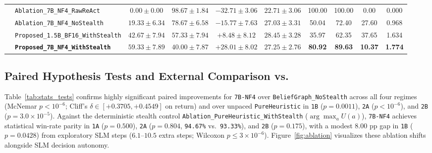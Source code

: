\documentclass[a4paper,fleqn]{cas-dc}
\begin{document}
\begin{table}[t]
{\begin{tabular}{llcccccccc}
  & \texttt{Ablation\_7B\_NF4\_RawReAct} & $0.00 \pm 0.00$ & $98.67 \pm 1.84$ & $-32.71 \pm 3.06$ & $22.71 \pm 3.06$ & 100.00 & 100.00 & 0.00 & 0.000 \\
  & \texttt{Ablation\_7B\_NF4\_NoStealth} & $19.33 \pm 6.34$ & $78.67 \pm 6.58$ & $-15.77 \pm 7.63$ & $27.03 \pm 3.31$ & 50.04 & 72.40 & 27.60 & 0.968 \\
  & \texttt{Proposed\_1.5B\_BF16\_WithStealth} & $42.67 \pm 7.94$ & $57.33 \pm 7.94$ & $+8.48 \pm 8.12$ & $28.45 \pm 3.28$ & 35.97 & 62.35 & 37.65 & 1.634 \\
  & \textbf{\texttt{Proposed\_7B\_NF4\_WithStealth}} & $59.33 \pm 7.89$ & $40.00 \pm 7.87$ & $+28.01 \pm 8.02$ & $27.25 \pm 2.76$ & \textbf{80.92} & \textbf{89.63} & \textbf{10.37} & \textbf{1.774} \\
\bottomrule
\end{tabular}%
}
\end{table}

\subsection{Paired Hypothesis Tests and External Comparison vs.\ \citet{rigaki2026building}}
Table~\ref{tab:stats_tests} confirms highly significant paired improvements for \texttt{7B-NF4} over \texttt{BeliefGraph\_NoStealth} across all four regimes (McNemar $p < 10^{-6}$; Cliff's $\delta \in [+0.3705, +0.4549]$ on return) and over unpaced \texttt{PureHeuristic} in \texttt{1B} ($p = 0.0011$), \texttt{2A} ($p < 10^{-6}$), and \texttt{2B} ($p = 3.0 \times 10^{-5}$). Against the deterministic stealth control \texttt{Ablation\_PureHeuristic\_WithStealth} ($\arg\max_a U(a)$), \texttt{7B-NF4} achieves statistical win-rate parity in \texttt{1A} ($p = 0.500$), \texttt{2A} ($p = 0.804$, \texttt{94.67\%} vs.\ \texttt{93.33\%}), and \texttt{2B} ($p = 0.175$), with a modest $8.00\text{ pp}$ gap in \texttt{1B} ($p = 0.0428$) from exploratory SLM steps ($6.1$--$10.5$ extra steps; Wilcoxon $p \le 3 \times 10^{-6}$). Figure~\ref{fig:ablation} visualizes these ablation shifts alongside SLM decision autonomy.
\end{document}
